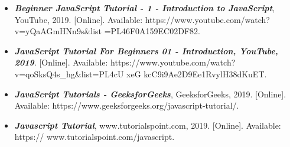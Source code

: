 \documentclass[12pt, a4paper]{report}
\begin{document}
\begin{itemize}
\begin{itemize}
    \item \textit{\textbf{Beginner JavaScript Tutorial - 1 - Introduction to JavaScript}}, YouTube, 2019. [Online]. Available: https://www.youtube.com/watch?v=yQaAGmHNn9s&list =PL46F0A159EC02DF82. 

    \item \textit{\textbf{JavaScript Tutorial For Beginners 01 - Introduction, YouTube, 2019}}. [Online]. Available: https://www.youtube.com/watch?v=qoSksQ4s{\_}hg&list=PL4cU xeG kcC9i9Ae2D9Ee1RvylH38dKuET.

    \item \textit{\textbf{JavaScript Tutorials - GeeksforGeeks}}, GeeksforGeeks, 2019. [Online]. Available: https://www.geeksforgeeks.org/javascript-tutorial/. 

    \item \textit{\textbf{Javascript Tutorial}}, www.tutorialspoint.com, 2019. [Online]. Available: https:// www.tutorialspoint.com/javascript.
    \end{itemize}
\end{itemize}
\end{document}

